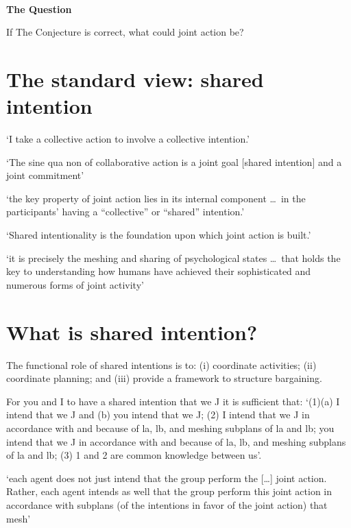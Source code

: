 \documentclass[11pt]{extarticle}
\begin{document}
\begin{multicols}{3}
\

\begin{center}
{\Large
\textbf{The Question}
}
\end{center}
If The Conjecture is correct, what could joint action be?

\section{The standard view: shared intention}

`I take a collective action to involve a collective intention.'  \citep%
{Gilbert:2006wr}

`The sine qua non of collaborative action is a joint goal [shared intention] and a joint commitment’ 
\citep%
{tomasello:2008origins}

`the key property of joint action lies in its internal component \ldots \ in the participants’ having a ``collective'' or ``shared'' intention.' \citep%
{alonso_shared_2009}

`Shared intentionality is the foundation upon which joint action is built.' \citep%
{Carpenter:2009wq}

`it is precisely the meshing and sharing of psychological states \ldots \ that holds the key to understanding how humans have achieved their sophisticated and numerous forms of joint activity'
\citep%
{Call:2009fk}



\section{What is shared intention?}

The functional role of shared intentions is to: 
(i) coordinate activities; (ii) coordinate planning; and (iii) provide a framework to structure bargaining.\citep%
{Bratman:1993je}

For you and I to have a shared intention that we J it is sufficient that: `(1)(a) I intend that we J and (b) you intend that we J; (2) I intend that we J in accordance with and because of la, lb, and meshing subplans of la and lb; you intend that we J in accordance with and because of la, lb, and meshing subplans of la and lb; (3) 1 and 2 are common knowledge between us'.\citep%
{Bratman:1993je}


`each agent does not just intend that the group perform the […] joint action. Rather, each agent intends as well that the group perform this joint action in accordance with subplans (of the intentions in favor of the joint action) that mesh' \citep%
{Bratman:1992mi}


\end{multicols}
\end{document}
